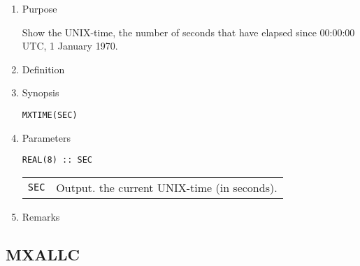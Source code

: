 \documentclass[a4paper]{scrartcl}
\begin{document}
\begin{enumerate}

\item Purpose

Show the UNIX-time, the number of seconds that have elapsed since
00:00:00 UTC, 1 January 1970.

\item Definition

\item Synopsis
    
\texttt{MXTIME(SEC)}
  
\item Parameters

\begin{verbatim}
REAL(8) :: SEC
\end{verbatim}
  
\begin{tabular}{ll}
\texttt{SEC} & Output. the current UNIX-time (in seconds).
\end{tabular}

\item Remarks

\end{enumerate}


\subsection{MXALLC}
\end{document}
